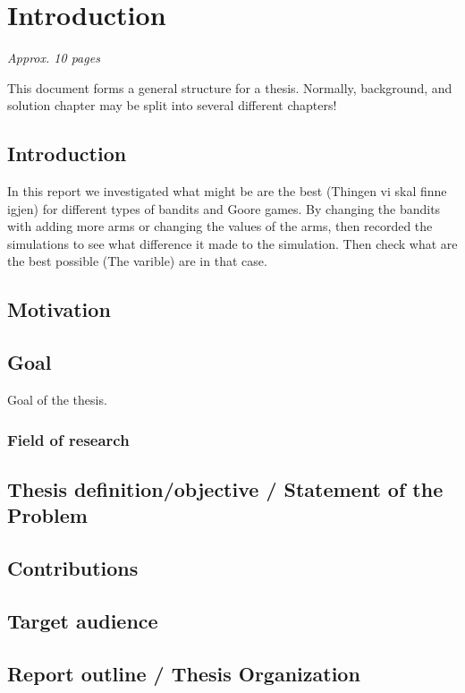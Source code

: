 \chapter{Introduction}
\label{ch:introduction}

\textit{Approx. 10 pages}

This document forms a general structure for a thesis.
Normally, background, and solution chapter may be split into several different chapters!

\section{Introduction}
In this report we investigated what might be are the best (Thingen vi skal finne igjen) for different 
types of bandits and Goore games. By changing the bandits with adding more arms or changing the values 
of the arms, then recorded the simulations to see what difference it made to the simulation. Then check 
what are the best possible (The varible) are in that case.
\section{Motivation}

\section{Goal}
Goal of the thesis.

\subsection{Field of research}

\section{Thesis definition/objective / Statement of the Problem}

\section{Contributions}
 
\section{Target audience}


\section{Report outline / Thesis Organization}

